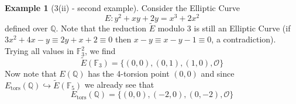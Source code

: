 \documentclass{scrartcl}
\newcommand{\F}{\mathbb{F}}
\newcommand{\Q}{\mathbb{Q}}
\renewcommand{\O}{\mathcal{O}}
\theoremstyle{definition}
\newtheorem{example}[subsection]{Example}
\begin{document}
\begin{example}[3(ii) - second example]
    Consider the Elliptic Curve
    \begin{equation*}
        E: y^2 + x y + 2 y = x^3 + 2 x^2
    \end{equation*}
    defined over $\Q$.
    Note that the reduction $\tilde{E}$ modulo $3$ is still an Elliptic Curve
    (if $3x^2 + 4x - y \equiv 2y + x + 2 \equiv 0$ then $x - y \equiv x - y - 1 \equiv 0$, a contradiction).
    Trying all values in $\F_3^2$, we find
    \begin{equation*}
        \tilde{E}(\F_3) = \{ (0, 0), (0, 1), (1, 0), \O \} 
    \end{equation*}
    Now note that $E(\Q)$ has the 4-torsion point $(0, 0)$ and since $E_{\mathrm{tors}}(\Q) \hookrightarrow \tilde{E}(\F_5)$ we already see that
    \begin{equation*}
        E_{\mathrm{tors}}(\Q) = \{ (0, 0), (-2, 0), (0, -2), \O \}
    \end{equation*}
\end{example}
\end{document}
